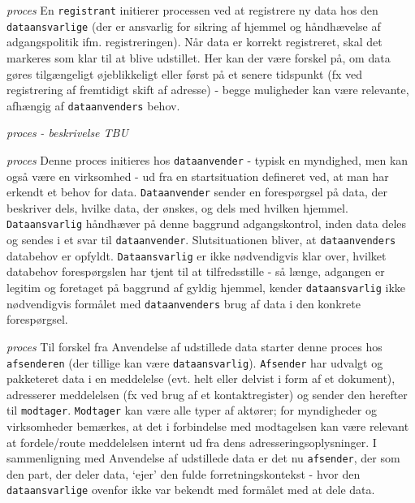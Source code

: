 \begin{description}
\tightlist
\item[Registrering]
\emph{proces} En \texttt{registrant} initierer processen ved at
registrere ny data hos den \texttt{dataansvarlige} (der er ansvarlig for
sikring af hjemmel og håndhævelse af adgangspolitik ifm.
registreringen). Når data er korrekt registreret, skal det markeres som
klar til at blive udstillet. Her kan der være forskel på, om data gøres
tilgængeligt øjeblikkeligt eller først på et senere tidspunkt (fx ved
registrering af fremtidigt skift af adresse) - begge muligheder kan være
relevante, afhængig af \texttt{dataanvenders} behov.
\item[Indsigt i anvendelse]
\emph{proces} \emph{- beskrivelse TBU}
\item[Anvendelse af udstillede data]
\emph{proces} Denne proces initieres hos \texttt{dataanvender} - typisk
en myndighed, men kan også være en virksomhed - ud fra en startsituation
defineret ved, at man har erkendt et behov for data.
\texttt{Dataanvender} sender en forespørgsel på data, der beskriver
dels, hvilke data, der ønskes, og dels med hvilken hjemmel.
\texttt{Dataansvarlig} håndhæver på denne baggrund adgangskontrol, inden
data deles og sendes i et svar til \texttt{dataanvender}.
Slutsituationen bliver, at \texttt{dataanvenders} databehov er opfyldt.
\texttt{Dataansvarlig} er ikke nødvendigvis klar over, hvilket databehov
forespørgslen har tjent til at tilfredsstille - så længe, adgangen er
legitim og foretaget på baggrund af gyldig hjemmel, kender
\texttt{dataansvarlig} ikke nødvendigvis formålet med
\texttt{dataanvenders} brug af data i den konkrete forespørgsel.
\item[Registreret forsendelse]
\emph{proces} Til forskel fra Anvendelse af udstillede data starter
denne proces hos \texttt{afsenderen} (der tillige kan være
\texttt{dataansvarlig}). \texttt{Afsender} har udvalgt og pakketeret
data i en meddelelse (evt. helt eller delvist i form af et dokument),
adresserer meddelelsen (fx ved brug af et kontaktregister) og sender den
herefter til \texttt{modtager}. \texttt{Modtager} kan være alle typer af
aktører; for myndigheder og virksomheder bemærkes, at det i forbindelse
med modtagelsen kan være relevant at fordele/route meddelelsen internt
ud fra dens adresseringsoplysninger. I sammenligning med Anvendelse af
udstillede data er det nu \texttt{afsender}, der som den part, der deler
data, `ejer' den fulde forretningskontekst - hvor den
\texttt{dataansvarlige} ovenfor ikke var bekendt med formålet med at
dele data.
\end{description}

